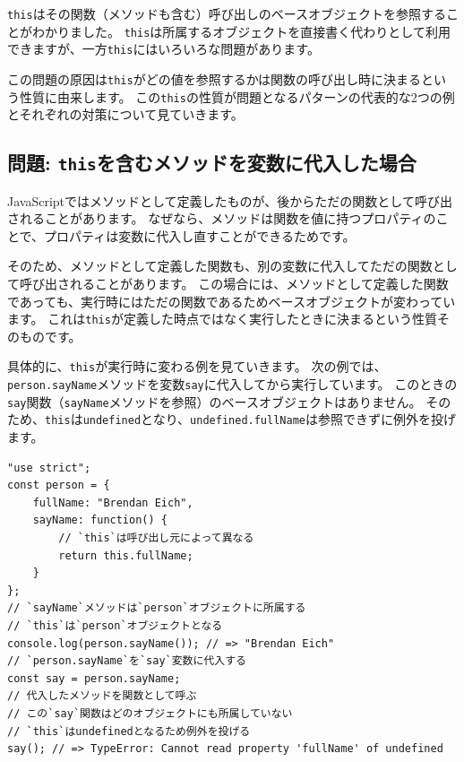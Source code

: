 \texttt{this}はその関数（メソッドも含む）呼び出しのベースオブジェクトを参照することがわかりました。
\texttt{this}は所属するオブジェクトを直接書く代わりとして利用できますが、一方\texttt{this}にはいろいろな問題があります。

この問題の原因は\texttt{this}がどの値を参照するかは関数の呼び出し時に決まるという性質に由来します。
この\texttt{this}の性質が問題となるパターンの代表的な2つの例とそれぞれの対策について見ていきます。

\hypertarget{assign-this-function}{%
\subsection{\texorpdfstring{問題:
\texttt{this}を含むメソッドを変数に代入した場合}{問題: thisを含むメソッドを変数に代入した場合}}\label{assign-this-function}}

JavaScriptではメソッドとして定義したものが、後からただの関数として呼び出されることがあります。
なぜなら、メソッドは関数を値に持つプロパティのことで、プロパティは変数に代入し直すことができるためです。

そのため、メソッドとして定義した関数も、別の変数に代入してただの関数として呼び出されることがあります。
この場合には、メソッドとして定義した関数であっても、実行時にはただの関数であるためベースオブジェクトが変わっています。
これは\texttt{this}が定義した時点ではなく実行したときに決まるという性質そのものです。

具体的に、\texttt{this}が実行時に変わる例を見ていきます。
次の例では、\texttt{person.sayName}メソッドを変数\texttt{say}に代入してから実行しています。
このときの\texttt{say}関数（\texttt{sayName}メソッドを参照）のベースオブジェクトはありません。
そのため、\texttt{this}は\texttt{undefined}となり、\texttt{undefined.fullName}は参照できずに例外を投げます。

\begin{lstlisting}
"use strict";
const person = {
    fullName: "Brendan Eich",
    sayName: function() {
        // `this`は呼び出し元によって異なる
        return this.fullName;
    }
};
// `sayName`メソッドは`person`オブジェクトに所属する
// `this`は`person`オブジェクトとなる
console.log(person.sayName()); // => "Brendan Eich"
// `person.sayName`を`say`変数に代入する
const say = person.sayName;
// 代入したメソッドを関数として呼ぶ
// この`say`関数はどのオブジェクトにも所属していない
// `this`はundefinedとなるため例外を投げる
say(); // => TypeError: Cannot read property 'fullName' of undefined
\end{lstlisting}

